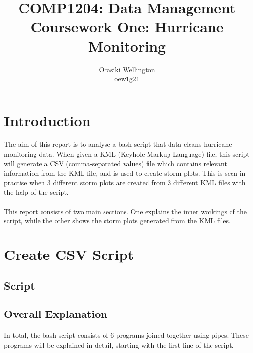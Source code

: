 \documentclass[]{article}
\title{COMP1204: Data Management \\ Coursework One: Hurricane Monitoring }
\author{Orasiki Wellington \\ oew1g21}
\begin{document}
\maketitle

\section{Introduction}
\paragraph{}The aim of this report is to analyse a bash script that data cleans hurricane monitoring data. When given a KML (Keyhole Markup Language) file, this script will generate a CSV (comma-separated values) file which contains relevant information from the KML file, and is used to create storm plots. This is seen in practise when 3 different storm plots are created from 3 different KML files with the help of the script.

\paragraph{}This report consists of two main sections. One explains the inner workings of the script, while the other shows the storm plots generated from the KML files.


\section{Create CSV Script}

\subsection{Script}



\subsection{Overall Explanation}

\paragraph{}In total, the bash script consists of 6 programs joined together using pipes. These programs will be explained in detail, starting with the first line of the script.
\end{document}
